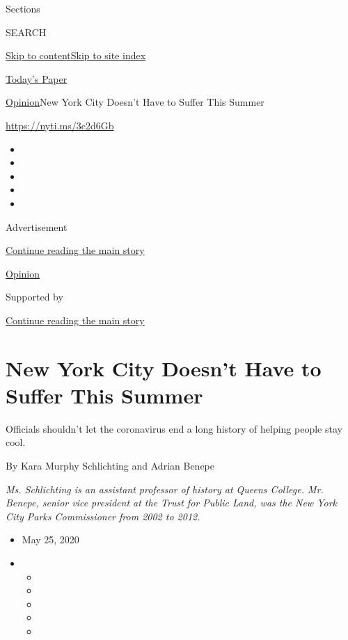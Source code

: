 Sections

SEARCH

\protect\hyperlink{site-content}{Skip to
content}\protect\hyperlink{site-index}{Skip to site index}

\href{https://myaccount.nytimes.com/auth/login?response_type=cookie\&client_id=vi}{}

\href{https://www.nytimes.com/section/todayspaper}{Today's Paper}

\href{/section/opinion}{Opinion}\textbar{}New York City Doesn't Have to
Suffer This Summer

\href{https://nyti.ms/3c2d6Gb}{https://nyti.ms/3c2d6Gb}

\begin{itemize}
\item
\item
\item
\item
\item
\end{itemize}

Advertisement

\protect\hyperlink{after-top}{Continue reading the main story}

\href{/section/opinion}{Opinion}

Supported by

\protect\hyperlink{after-sponsor}{Continue reading the main story}

\hypertarget{new-york-city-doesnt-have-to-suffer-this-summer}{%
\section{New York City Doesn't Have to Suffer This
Summer}\label{new-york-city-doesnt-have-to-suffer-this-summer}}

Officials shouldn't let the coronavirus end a long history of helping
people stay cool.

By Kara Murphy Schlichting and Adrian Benepe

\emph{Ms. Schlichting is an assistant professor of history at Queens
College. Mr. Benepe, senior vice president at the Trust for Public Land,
was the New York City Parks Commissioner from 2002 to 2012.}

\begin{itemize}
\item
  May 25, 2020
\item
  \begin{itemize}
  \item
  \item
  \item
  \item
  \item
  \end{itemize}
\end{itemize}

